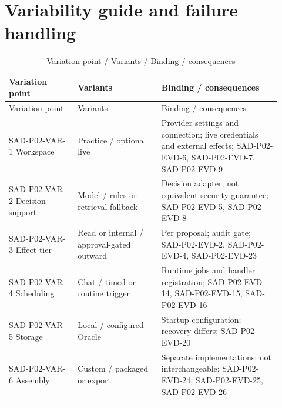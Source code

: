 \documentclass[10pt,letterpaper]{article}
\begin{document}
\section{Variability guide and failure handling}
\begin{longtable}{@{}>{\raggedright\arraybackslash}p{0.23\linewidth}>{\raggedright\arraybackslash}p{0.29\linewidth}>{\raggedright\arraybackslash}p{0.4\linewidth}@{}}
\caption{Variation point / Variants / Binding / consequences}\\
\toprule Variation point & Variants & Binding / consequences\\\midrule\endfirsthead
\toprule Variation point & Variants & Binding / consequences\\\midrule\endhead
SAD-P02-VAR-1 Workspace & Practice / optional live & Provider settings and connection; live credentials and external effects; SAD-P02-EVD-6, SAD-P02-EVD-7, SAD-P02-EVD-9\\\addlinespace
SAD-P02-VAR-2 Decision support & Model / rules or retrieval fallback & Decision adapter; not equivalent security guarantee; SAD-P02-EVD-5, SAD-P02-EVD-8\\\addlinespace
SAD-P02-VAR-3 Effect tier & Read or internal / approval-gated outward & Per proposal; audit gate; SAD-P02-EVD-2, SAD-P02-EVD-4, SAD-P02-EVD-23\\\addlinespace
SAD-P02-VAR-4 Scheduling & Chat / timed or routine trigger & Runtime jobs and handler registration; SAD-P02-EVD-14, SAD-P02-EVD-15, SAD-P02-EVD-16\\\addlinespace
SAD-P02-VAR-5 Storage & Local / configured Oracle & Startup configuration; recovery differs; SAD-P02-EVD-20\\\addlinespace
SAD-P02-VAR-6 Assembly & Custom / packaged or export & Separate implementations; not interchangeable; SAD-P02-EVD-24, SAD-P02-EVD-25, SAD-P02-EVD-26\\\addlinespace
\bottomrule\end{longtable}
\end{document}

